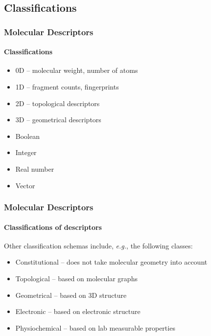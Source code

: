 \documentclass[aspectratio=169]{beamer}
\begin{document}
\subsection{Classifications}
       \begin{frame}
        \frametitle{Molecular Descriptors}
        \framesubtitle{Classifications}
        \begin{minipage}[c]{0.6\textwidth}
        \begin{itemize}
            \item 0D -- molecular weight, number of atoms
            \item 1D -- fragment counts, fingerprints
            \item 2D -- topological descriptors
            \item 3D -- geometrical descriptors
        \end{itemize}
        \endoldBlock
        \end{minipage}
        \hfill
        \begin{minipage}[c]{0.35\textwidth}
        \begin{itemize}
            \item Boolean
            \item Integer
            \item Real number
            \item Vector
        \end{itemize} 
        \endoldBlock
        \end{minipage}

    \end{frame}

    \begin{frame}
        \frametitle{Molecular Descriptors}
        \framesubtitle{Classifications of descriptors}
        \small
        \begin{block}{Other classification schemas include, \textit{e.g.}, the following classes:}
            \begin{itemize}
                \item Constitutional -- does not take molecular geometry into account
                \item Topological -- based on molecular graphs
                \item Geometrical -- based on 3D structure
                \item Electronic -- based on electronic structure
                \item Physiochemical -- based on lab measurable properties
            \end{itemize}
        \end{block}
        \centering
    \end{frame}
\end{document}
